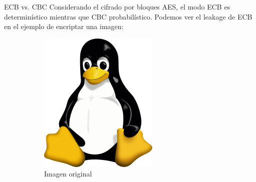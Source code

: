 \begin{frame}{ECB vs. CBC}
  Considerando el cifrado por bloques AES, el modo ECB es determinístico mientras que CBC probabilístico.
  Podemos ver el leakage de ECB en el ejemplo de encriptar una imagen:
  \begin{figure}[h!]
    \centering 
    \begin{subfigure}[b]{0.3\textwidth}
      \centering 
      \includegraphics[width=\textwidth]{../images/Tux.png}
      \caption{Imagen original}
    \end{subfigure}
    \hfill
    \begin{subfigure}[b]{0.3\textwidth}
      \centering 

\end{subfigure}
\end{figure}
\end{frame}
